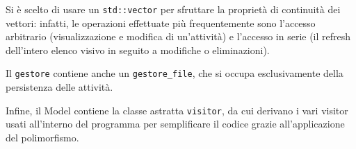 Si è scelto di usare un \texttt{std::vector} per sfruttare la proprietà di continuità dei vettori:
infatti, le operazioni effettuate più frequentemente sono l'accesso arbitrario (visualizzazione e
modifica di un'attività) e l'accesso in serie (il refresh dell'intero elenco visivo in seguito a
modifiche o eliminazioni).

Il \texttt{gestore} contiene anche un \texttt{gestore\_file}, che si occupa esclusivamente della
persistenza delle attività.

Infine, il Model contiene la classe astratta \texttt{visitor}, da cui derivano i vari visitor usati
all'interno del programma per semplificare il codice grazie all'applicazione del polimorfismo.